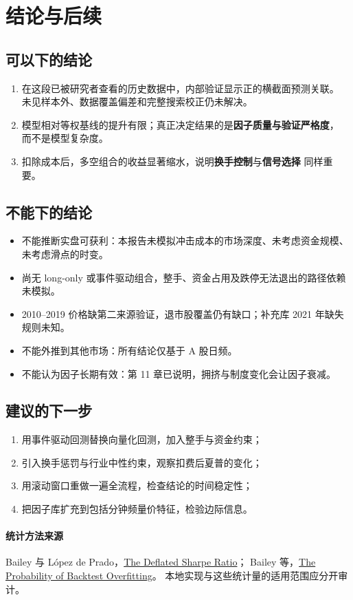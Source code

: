 \documentclass[UTF8,10pt,a4paper]{ctexart}
\begin{document}
\section{结论与后续}

\subsection{可以下的结论}

\begin{enumerate}
  \item 在这段已被研究者查看的历史数据中，内部验证显示正的横截面预测关联。
        未见样本外、数据覆盖偏差和完整搜索校正仍未解决。
  \item 模型相对等权基线的提升有限；真正决定结果的是\textbf{因子质量与验证严格度}，
        而不是模型复杂度。
  \item 扣除成本后，多空组合的收益显著缩水，说明\textbf{换手控制}与\textbf{信号选择}
        同样重要。
\end{enumerate}

\subsection{不能下的结论}

\begin{itemize}
  \item 不能推断实盘可获利：本报告未模拟冲击成本的市场深度、未考虑资金规模、
        未考虑滑点的时变。
  \item 尚无 long-only 或事件驱动组合，整手、资金占用及跌停无法退出的路径依赖未模拟。
  \item 2010--2019 价格缺第二来源验证，退市股覆盖仍有缺口；补充库 2021 年缺失规则未知。
  \item 不能外推到其他市场：所有结论仅基于 A 股日频。
  \item 不能认为因子长期有效：第 11 章已说明，拥挤与制度变化会让因子衰减。
\end{itemize}

\subsection{建议的下一步}

\begin{enumerate}
  \item 用事件驱动回测替换向量化回测，加入整手与资金约束；
  \item 引入换手惩罚与行业中性约束，观察扣费后夏普的变化；
  \item 用滚动窗口重做一遍全流程，检查结论的时间稳定性；
  \item 把因子库扩充到包括分钟频量价特征，检验边际信息。
\end{enumerate}

\paragraph{统计方法来源}
Bailey 与 L\'opez de Prado，\href{https://www.davidhbailey.com/dhbpapers/deflated-sharpe.pdf}{The Deflated Sharpe Ratio}；
Bailey 等，\href{https://www.davidhbailey.com/dhbpapers/backtest-prob.pdf}{The Probability of Backtest Overfitting}。
本地实现与这些统计量的适用范围应分开审计。
\end{document}
